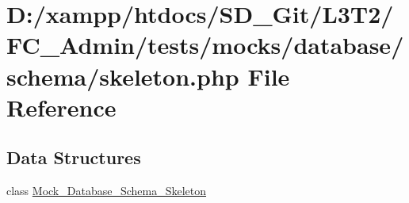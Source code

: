 \hypertarget{_admin_2tests_2mocks_2database_2schema_2skeleton_8php}{}\section{D\+:/xampp/htdocs/\+S\+D\+\_\+\+Git/\+L3\+T2/\+F\+C\+\_\+\+Admin/tests/mocks/database/schema/skeleton.php File Reference}
\label{_admin_2tests_2mocks_2database_2schema_2skeleton_8php}
\subsection*{Data Structures}
\begin{DoxyCompactItemize}
\item 
class \hyperlink{class_mock___database___schema___skeleton}{Mock\+\_\+\+Database\+\_\+\+Schema\+\_\+\+Skeleton}
\end{DoxyCompactItemize}
